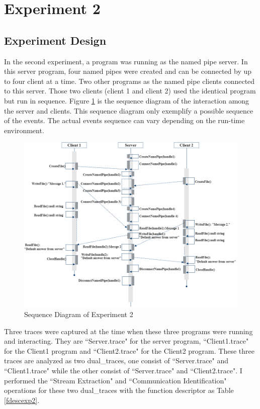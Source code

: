 \section{Experiment 2}
\subsection{Experiment Design}
In the second experiment, a program was running as the named pipe server. In this server program, four named pipes were created and can be connected by up to four client at a time. Two other programs as the named pipe clients connected to this server. Those two clients (client 1 and client 2) used the identical program but run in sequence. Figure \ref{exp2} is the sequence diagram of the interaction among the server and clients. This sequence diagram only exemplify a possible sequence of the events. The actual events sequence can vary depending on the run-time environment. 

\begin{figure}[H]
\centerline{\includegraphics[scale=0.55]{Figures/exp2}}
 \caption{Sequence Diagram of Experiment 2}
\label{exp2}
\end{figure}

Three traces were captured at the time when these three programs were running and interacting. They are ``Server.trace" for the server program, ``Client1.trace" for the Client1 program and ``Client2.trace" for the Client2 program. These three traces are analyzed as two dual\_traces, one consist of ``Server.trace" and ``Client1.trace" while the other consist of ``Server.trace" and ``Client2.trace". I performed the ``Stream Extraction" and ``Communication Identification" operations for these two dual\_traces with the function descriptor as Table \ref{fdescexp2}.



